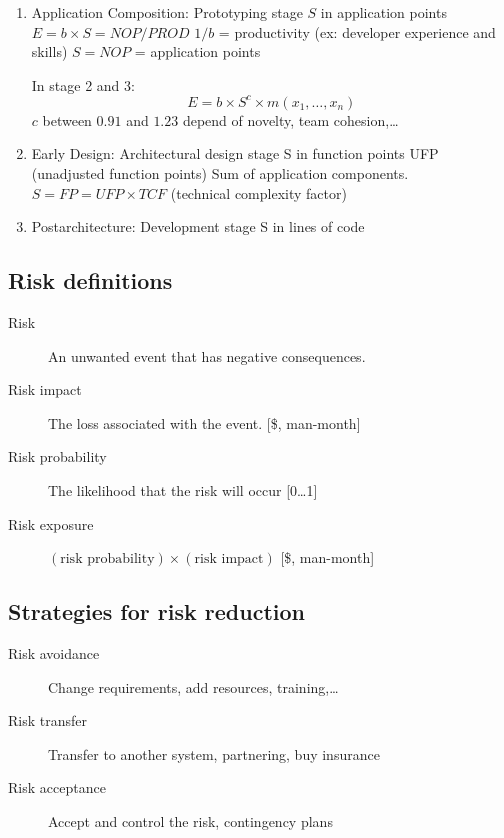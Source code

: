 \begin{enumerate}
    \item Application Composition:
        \subitem{} Prototyping stage
        \subitem{} $S$ in application points
        \subitem{} $E = b \times S = NOP / PROD$
        \subitem{} $1 / b$ = productivity (ex: developer experience and skills)
        \subitem{} $S = NOP$ = application points

    \begin{framed}
        In stage 2 and 3:
        $$E = b \times S^{c} \times m({x}_{1},\ldots, {x}_{n})$$
        $c$ between $0.91$ and $1.23$ depend of novelty, team cohesion,\ldots
    \end{framed}
    \item Early Design:
        \subitem{} Architectural design stage
        \subitem{} S in function points
        \subitem{} UFP (unadjusted function points) Sum of application components.
        \subitem{} $S = FP = UFP \times TCF$ (technical complexity factor)
    \item Postarchitecture:
        \subitem{} Development stage
        \subitem{} S in lines of code
\end{enumerate}

\subsection{Risk definitions}

\begin{description}
    \item[Risk] An unwanted event that has negative consequences.
    \item[Risk impact] The loss associated with the event. [\$, man-month]
    \item[Risk probability] The likelihood that the risk will occur [0\ldots1]
    \item[Risk exposure] $(\textrm{risk probability}) \times (\textrm{risk impact})$ [\$, man-month]
\end{description}

\subsection{Strategies for risk reduction}

\begin{description}
    \item[Risk avoidance] Change requirements, add resources, training,\ldots
    \item[Risk transfer] Transfer to another system, partnering, buy insurance
    \item[Risk acceptance] Accept and control the risk, contingency plans
\end{description}


